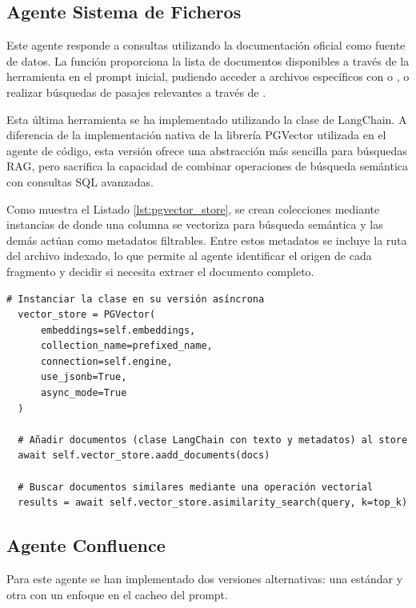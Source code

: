 \subsection{Agente Sistema de Ficheros}
\label{sec:agente_filesystem}
Este agente responde a consultas utilizando la documentación oficial como fuente de datos. La función  proporciona la lista de documentos disponibles a través de la herramienta  en el prompt inicial, pudiendo acceder a archivos específicos con  o , o realizar búsquedas de pasajes relevantes a través de .

Esta última herramienta se ha implementado utilizando la clase  de LangChain. A diferencia de la implementación nativa de la librería PGVector utilizada en el agente de código, esta versión ofrece una abstracción más sencilla para búsquedas RAG, pero sacrifica la capacidad de combinar operaciones de búsqueda semántica con consultas SQL avanzadas.

Como muestra el Listado \ref{lst:pgvector_store}, se crean colecciones mediante instancias de  donde una columna se vectoriza para búsqueda semántica y las demás actúan como metadatos filtrables. Entre estos metadatos se incluye la ruta del archivo indexado, lo que permite al agente identificar el origen de cada fragmento y decidir si necesita extraer el documento completo.

\begin{lstlisting}[caption={\protect\opus{PGVector}: uso de clase para indexar o buscar documentos}, label={lst:pgvector_store}]
  # Instanciar la clase en su versión asíncrona 
  vector_store = PGVector(
      embeddings=self.embeddings,
      collection_name=prefixed_name,
      connection=self.engine,
      use_jsonb=True,
      async_mode=True
  )

  # Añadir documentos (clase LangChain con texto y metadatos) al store
  await self.vector_store.aadd_documents(docs)

  # Buscar documentos similares mediante una operación vectorial
  results = await self.vector_store.asimilarity_search(query, k=top_k)
\end{lstlisting}

\subsection{Agente Confluence}
Para este agente se han implementado dos versiones alternativas: una estándar y otra con un enfoque en el cacheo del prompt.

